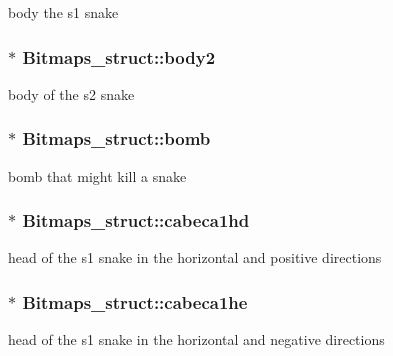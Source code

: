 body the s1 snake 

\subsubsection[{\texorpdfstring{body2}{body2}}]{$\ast$ Bitmaps\+\_\+struct\+::body2}\hypertarget{group__graphics_ga8b84da2f75b89636fa34ff1cd47215f4}{}\label{group__graphics_ga8b84da2f75b89636fa34ff1cd47215f4}


body of the s2 snake 

\subsubsection[{\texorpdfstring{bomb}{bomb}}]{$\ast$ Bitmaps\+\_\+struct\+::bomb}\hypertarget{group__graphics_ga86313247313ec7e1e264d13835d7d012}{}\label{group__graphics_ga86313247313ec7e1e264d13835d7d012}


bomb that might kill a snake 

\subsubsection[{\texorpdfstring{cabeca1hd}{cabeca1hd}}]{$\ast$ Bitmaps\+\_\+struct\+::cabeca1hd}\hypertarget{group__graphics_ga7740065d096144bd6f6f9457083584d9}{}\label{group__graphics_ga7740065d096144bd6f6f9457083584d9}


head of the s1 snake in the horizontal and positive directions 

\subsubsection[{\texorpdfstring{cabeca1he}{cabeca1he}}]{$\ast$ Bitmaps\+\_\+struct\+::cabeca1he}\hypertarget{group__graphics_ga5989c4f83267088c9fdb6d1251d2e092}{}\label{group__graphics_ga5989c4f83267088c9fdb6d1251d2e092}


head of the s1 snake in the horizontal and negative directions 

